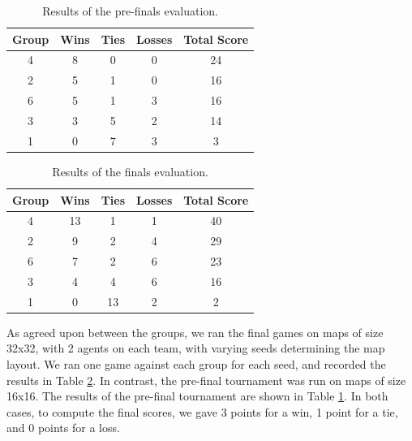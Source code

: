 \documentclass[a4paper,12pt]{article}
\begin{document}

\begin{table}[!hptb]
  \centering
  \begin{tabular}{|c|c|c|c|c|}
    \hline
    \textbf{Group} & \textbf{Wins} & \textbf{Ties} & \textbf{Losses} & \textbf{Total Score} \\
    \hline
    4 & 8 & 0 & 0 & 24 \\
    \hline
    2 & 5 & 1 & 0 & 16 \\
    \hline
    6 & 5 & 1 & 3 & 16 \\
    \hline
    3 & 3 & 5 & 2 & 14 \\
    \hline
    1 & 0 & 7 & 3 & 3 \\
    \hline
  \end{tabular}
  \caption{Results of the pre-finals evaluation.}
  \label{tab:results_prefinals}
\end{table}


\begin{table}[!hptb]
  \centering
  \begin{tabular}{|c|c|c|c|c|}
    \hline
    \textbf{Group} & \textbf{Wins} & \textbf{Ties} & \textbf{Losses} & \textbf{Total Score} \\
    \hline
    4 & 13 & 1 & 1 & 40 \\
    \hline
    2 & 9 & 2 & 4 & 29 \\
    \hline
    6 & 7 & 2 & 6 & 23 \\
    \hline
    3 & 4 & 4 & 6 & 16 \\
    \hline
    1 & 0 & 13 & 2 & 2 \\
    \hline
  \end{tabular}
  \caption{Results of the finals evaluation.}
  \label{tab:results_finals}
\end{table}






As agreed upon between the groups, we ran the final games on maps  of size 32x32, with 2 agents on each team, with varying seeds determining the map layout. We ran one game against each group for each seed, and recorded the results in Table \ref{tab:results_finals}. In contrast, the pre-final tournament was run on maps of size 16x16. The results of the pre-final tournament are shown in Table \ref{tab:results_prefinals}. In both cases, to compute the final scores, we gave 3 points for a win, 1 point for a tie, and 0 points for a loss.
\end{document}
